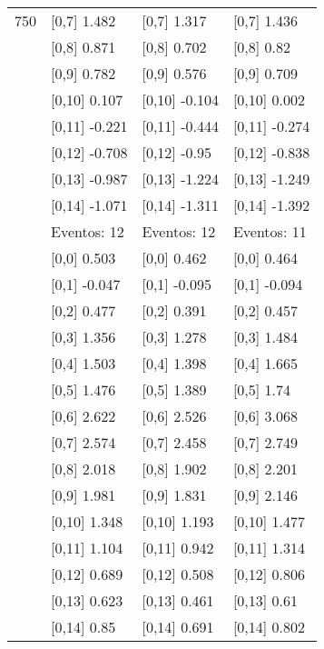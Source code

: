 \begin{table}
\begin{tabular}[t]{llll}
750 & {}[0,7] 1.482 & {}[0,7] 1.317 & {}[0,7] 1.436\\
\addlinespace
 & {}[0,8] 0.871 & {}[0,8] 0.702 & {}[0,8] 0.82\\
 & {}[0,9] 0.782 & {}[0,9] 0.576 & {}[0,9] 0.709\\
 & {}[0,10] 0.107 & {}[0,10] -0.104 & {}[0,10] 0.002\\
 & {}[0,11] -0.221 & {}[0,11] -0.444 & {}[0,11] -0.274\\
 & {}[0,12] -0.708 & {}[0,12] -0.95 & {}[0,12] -0.838\\
\addlinespace
 & {}[0,13] -0.987 & {}[0,13] -1.224 & {}[0,13] -1.249\\
 & {}[0,14] -1.071 & {}[0,14] -1.311 & {}[0,14] -1.392\\
 & Eventos:  12 & Eventos:  12 & Eventos:  11\\
 & {}[0,0] 0.503 & {}[0,0] 0.462 & {}[0,0] 0.464\\
 & {}[0,1] -0.047 & {}[0,1] -0.095 & {}[0,1] -0.094\\
\addlinespace
 & {}[0,2] 0.477 & {}[0,2] 0.391 & {}[0,2] 0.457\\
 & {}[0,3] 1.356 & {}[0,3] 1.278 & {}[0,3] 1.484\\
 & {}[0,4] 1.503 & {}[0,4] 1.398 & {}[0,4] 1.665\\
 & {}[0,5] 1.476 & {}[0,5] 1.389 & {}[0,5] 1.74\\
 & {}[0,6] 2.622 & {}[0,6] 2.526 & {}[0,6] 3.068\\
\addlinespace
1000 & {}[0,7] 2.574 & {}[0,7] 2.458 & {}[0,7] 2.749\\
 & {}[0,8] 2.018 & {}[0,8] 1.902 & {}[0,8] 2.201\\
 & {}[0,9] 1.981 & {}[0,9] 1.831 & {}[0,9] 2.146\\
 & {}[0,10] 1.348 & {}[0,10] 1.193 & {}[0,10] 1.477\\
 & {}[0,11] 1.104 & {}[0,11] 0.942 & {}[0,11] 1.314\\
\addlinespace
 & {}[0,12] 0.689 & {}[0,12] 0.508 & {}[0,12] 0.806\\
 & {}[0,13] 0.623 & {}[0,13] 0.461 & {}[0,13] 0.61\\
 & {}[0,14] 0.85 & {}[0,14] 0.691 & {}[0,14] 0.802\\
\bottomrule
\end{tabular}
\end{table}
